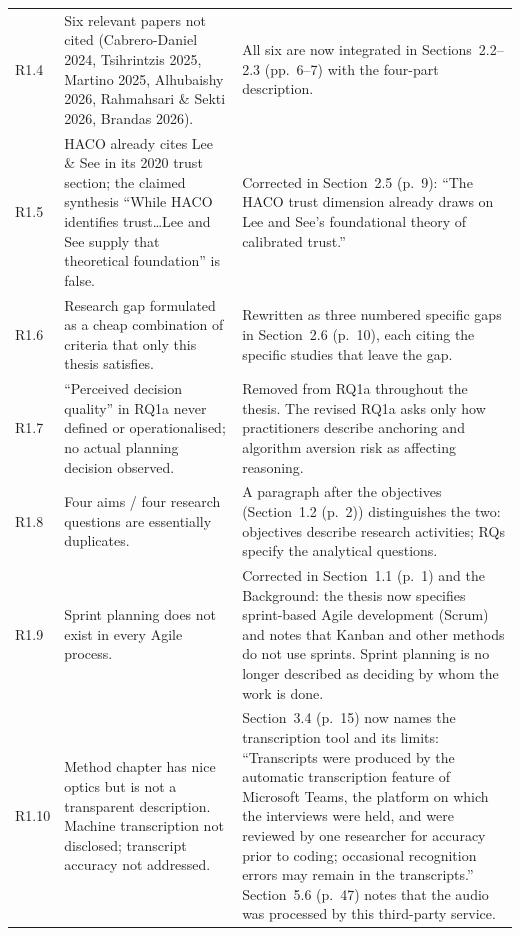 \documentclass[12pt,a4paper,twoside]{article}
\begin{document}
{\begin{longtable}{p{1cm}p{6.7cm}p{7cm}}
R1.4 &
Six relevant papers not cited (Cabrero-Daniel 2024, Tsihrintzis 2025, Martino 2025,
Alhubaishy 2026, Rahmahsari \& Sekti 2026, Brandas 2026). &
All six are now integrated in Sections~2.2--2.3 (pp.~6--7) with the four-part description. \\

R1.5 &
HACO already cites Lee \& See in its 2020 trust section; the claimed synthesis ``While
HACO identifies trust\ldots Lee and See supply that theoretical foundation'' is false. &
Corrected in Section~2.5 (p.~9): ``The HACO trust dimension already draws on Lee and See's
foundational theory of calibrated trust.'' \\

R1.6 &
Research gap formulated as a cheap combination of criteria that only this thesis
satisfies. &
Rewritten as three numbered specific gaps in Section~2.6 (p.~10), each citing the specific
studies that leave the gap. \\

R1.7 &
``Perceived decision quality'' in RQ1a never defined or operationalised; no actual
planning decision observed. &
Removed from RQ1a throughout the thesis. The revised RQ1a asks only how practitioners
describe anchoring and algorithm aversion risk as affecting reasoning. \\

R1.8 &
Four aims / four research questions are essentially duplicates. &
A paragraph after the objectives (Section~1.2 (p.~2)) distinguishes the two: objectives
describe research activities; RQs specify the analytical questions. \\

R1.9 &
Sprint planning does not exist in every Agile process. &
Corrected in Section~1.1 (p.~1) and the Background: the thesis now specifies sprint-based Agile development (Scrum) and notes that Kanban and other methods do not use sprints. Sprint planning is no longer described as deciding by whom the work is done. \\

R1.10 &
Method chapter has nice optics but is not a transparent description. Machine
transcription not disclosed; transcript accuracy not addressed. &
Section~3.4 (p.~15) now names the transcription tool and its limits: ``Transcripts were produced by the automatic transcription feature of Microsoft Teams, the platform on which the interviews were held, and were reviewed by one researcher for accuracy prior to coding; occasional recognition errors may remain in the transcripts.'' Section~5.6 (p.~47) notes that the audio was processed by this third-party service. \\


\end{longtable}}
\end{document}
